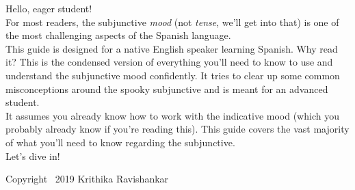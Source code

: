 Hello, eager student!\\

For most readers, the subjunctive \textit{mood} (not \textit{tense}, we'll get into that) is one of the most challenging aspects of the Spanish language. \\

This guide is designed for a native English speaker learning Spanish. Why read it? This is the condensed version of everything you'll need to know to use and understand the subjunctive mood confidently. It tries to clear up some common misconceptions around the spooky subjunctive and is meant for an advanced student. \\

It assumes you already know how to work with the indicative mood (which you probably already know if you're reading this). This guide covers the vast majority of what you'll need to know regarding the subjunctive.  \\

Let's dive in!

\vfill
{\footnotesize Copyright \textcopyright\ 2019 Krithika Ravishankar}
